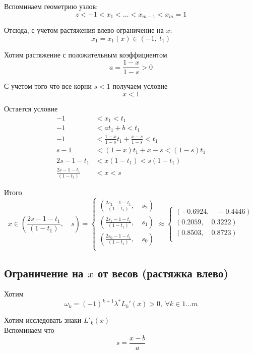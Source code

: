 \documentclass[12pt,a4paper]{article}
\begin{document}
	\noindent Вспоминаем геометрию узлов:
	\[
	z < -1 < x_1 < \ldots < x_{m-1} < x_m = 1
	\]
	
	\noindent Отсюда, с учетом растяжения влево ограничение на $x$:
	\[
	x_1 = x_1(x) \in (-1, \ t_1)
	\]
	
	
	\noindent Хотим растяжение с положительным коэффициентом
	\[
	a =  \frac{1-x}{1-s} > 0
	\]
	
	\noindent С учетом того что все корни $s < 1$ получаем условие
	\[
	x < 1
	\]
	
	\noindent Остается условие
	\begin{align*}
		-1 &< x_1 < t_1 \\
		-1 &< a t_1 + b < t_1 \\
		-1 &< \frac{1-x}{1-s} t_1 + \frac{x-s}{1-s} < t_1 \\
		s - 1 &< (1 - x) t_{1} + x - s < (1 - s)t_1 \\
		2s - 1 - t_1 &< x(1 - t_{1}) < s(1-t_1) \\ 
		\frac{2s - 1 - t_1}{(1 - t_{1})} &< x <  s
	\end{align*}
	
	\noindent Итого
	\[
	x \in \left(\frac{2s - 1 - t_1}{(1 - t_{1})}, \quad s  \right) = 
	\begin{cases}
		\left(\frac{2s_2 - 1 - t_1}{(1 - t_{1})}, \quad s_2  \right) \\
		\left(\frac{2s_1 - 1 - t_1}{(1 - t_{1})}, \quad s_1  \right) \\
		\left(\frac{2s_0 - 1 - t_1}{(1 - t_{1})}, \quad s_0  \right) \\
	\end{cases} \approx 
	\begin{cases}
		\left(-0.6924, \quad -0.4446  \right) \\
		\left(0.2059, \quad 0.3222 \right) \\
		\left(0.8503, \quad 0.8723 \right) \\
	\end{cases}
	\]
	
	\subsection{Ограничение на $x$ от весов (растяжка влево)}
	\noindent Хотим
	\[
	\omega_k  = (-1)^{k+1} \lambda^* L_k'(x) > 0 , \ \forall k \in 1 \ldots m 
	\]
	
	\noindent Хотим исследовать знаки $L'_k(x)$\\
	Вспоминаем что
	\[
	s = \frac{x-b}{a}
	\]
	
\end{document}
